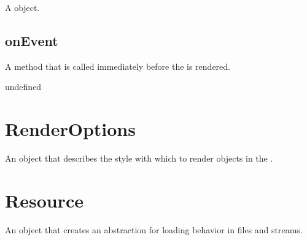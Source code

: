 \documentclass[letterpaper,12pt,english,openany,oneside]{sphinxmanual}
\begin{document}
\label{\detokenize{JS_3D_API:syntax-78}}

\begin{sphinxVerbatim}[commandchars=\\\{\}]
 
\end{sphinxVerbatim}
\label{\detokenize{JS_3D_API:returns-79}}

A  object.


\subsection{onEvent}
\label{\detokenize{JS_3D_API:onevent-5}}\label{\detokenize{JS_3D_API:id25}}
A method that is called immediately before the  is rendered.

\label{\detokenize{JS_3D_API:syntax-79}}

\begin{sphinxVerbatim}[commandchars=\\\{\}]
\end{sphinxVerbatim}
\label{\detokenize{JS_3D_API:parameters-57}}

\label{\detokenize{JS_3D_API:section-82}}\label{\detokenize{JS_3D_API:returns-80}}

undefined


\section{RenderOptions}
\label{\detokenize{JS_3D_API:renderoptions}}
An object that describes the style with which to render  objects in the .

\label{\detokenize{JS_3D_API:properties-22}}


\section{Resource}
\label{\detokenize{JS_3D_API:resource}}
An object that creates an abstraction for loading behavior in files and streams.
\end{document}
